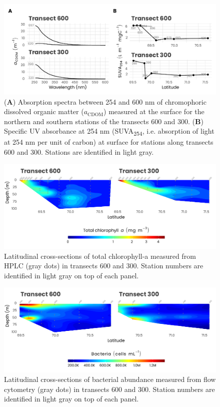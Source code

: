 \documentclass[essd, manuscript]{copernicus}
\begin{document}
\clearpage

\begin{figure}[H]
	\centering
	\includegraphics[scale = 1]{../../../graphs/fig06.pdf}
	\caption{(\textbf{A}) Absorption spectra between 254 and 600 nm of chromophoric dissolved organic matter ($a_{\text{CDOM}}$) measured at the surface for the northern and southern stations of the transects 600 and 300. (\textbf{B}) Specific UV absorbance at 254 nm (SUVA\textsubscript{254}, i.e. absorption of light at 254 nm per unit of carbon) at surface for stations along transects 600 and 300. Stations are identified in light gray.}
\end{figure}

\clearpage

\begin{figure}[H]
	\centering
	\includegraphics[scale = 1]{../../../graphs/fig07.pdf}
	\caption{Latitudinal cross-sections of total chlorophyll-a measured from HPLC (gray dots) in transects 600 and 300. Station numbers are identified in light gray on top of each panel.}
\end{figure}

\clearpage

\begin{figure}[H]
	\centering
	\includegraphics[scale = 1]{../../../graphs/fig08.pdf}
	\caption{Latitudinal cross-sections of bacterial abundance measured from flow cytometry (gray dots) in transects 600 and 300. Station numbers are identified in light gray on top of each panel.}
\end{figure}
\end{document}
